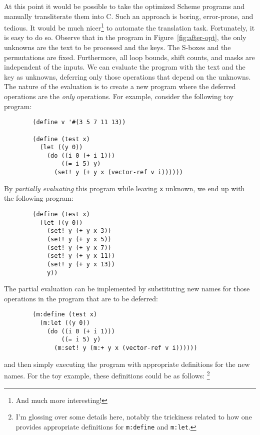 At this point it would be possible to take the optimized Scheme
programs and manually transliterate them into C.  Such an approach is
boring, error-prone, and tedious.  It would be much nicer\footnote{And
much more interesting!} to automate the translation task.
Fortunately, it is easy to do so.  Observe that in the program in
Figure~\ref{fig:after-opt}, the only unknowns are the text to be
processed and the keys.  The S-boxes and the permutations are fixed.
Furthermore, all loop bounds, shift counts, and masks are independent
of the inputs.  We can evaluate the program with the text and the key
as unknowns, deferring only those operations that depend on the
unknowns.  The nature of the evaluation is to create a new program where
the deferred operations are the {\em only} operations.  For example,
consider the following toy program:

\begin{verbatim}
        (define v '#(3 5 7 11 13))
        
        (define (test x)
          (let ((y 0))
            (do ((i 0 (+ i 1)))
                ((= i 5) y)
              (set! y (+ y x (vector-ref v i))))))
\end{verbatim}

\noindent
By {\em partially evaluating} \cite{partial} this program while leaving
{\tt x} unknown, we end up with the following program:

\begin{verbatim}
        (define (test x)
          (let ((y 0))
            (set! y (+ y x 3))
            (set! y (+ y x 5))
            (set! y (+ y x 7))
            (set! y (+ y x 11))
            (set! y (+ y x 13))
            y))
\end{verbatim}

\noindent
The partial evaluation can be implemented by substituting new names
for those operations in the program that are to be deferred:

\begin{verbatim}
        (m:define (test x)
          (m:let ((y 0))
            (do ((i 0 (+ i 1)))
                ((= i 5) y)
              (m:set! y (m:+ y x (vector-ref v i))))))
\end{verbatim}

\noindent
and then simply executing the program with appropriate definitions for
the new names.  For the toy example, these definitions could be as
follows:%
\footnote{I'm glossing over some details here, notably
the trickiness related to how one provides appropriate definitions
for {\tt m:define} and {\tt m:let}.}

